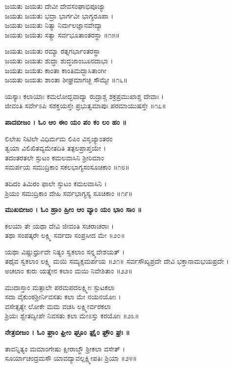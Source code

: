 ಜಯತು ಜಯತು ದೇವೀ ದೇವಸಂಘಾಭಿಪೂಜ್ಯಾ \\ಜಯತು ಜಯತು ಭದ್ರಾ ಭಾರ್ಗವೀ ಭಾಗ್ಯರೂಪಾ ।\\
ಜಯತು ಜಯತು ನಿತ್ಯಾ ನಿರ್ಮಲಜ್ಞಾನವೇದ್ಯಾ \\ಜಯತು ಜಯತು ಸತ್ಯಾ ಸರ್ವಭೂತಾಂತರಸ್ಥಾ ॥೧೫॥

	ಜಯತು ಜಯತು ರಮ್ಯಾ ರತ್ನಗರ್ಭಾಂತರಸ್ಥಾ \\ಜಯತು ಜಯತು ಶುದ್ಧಾ ಶುದ್ಧಜಾಂಬೂನದಾಭಾ ।\\
	ಜಯತು ಜಯತು ಕಾಂತಾ ಕಾಂತಿಮದ್ಭಾಸಿತಾಂಗೀ \\ಜಯತು ಜಯತು ಶಾಂತಾ ಶೀಘ್ರಮಾಗಚ್ಛ ಸೌಮ್ಯೇ ॥೧೬॥

ಯಸ್ಯಾಃ ಕಲಾಯಾಃ ಕಮಲೋದ್ಭವಾದ್ಯಾ ರುದ್ರಾಶ್ಚ ಶಕ್ರಪ್ರಮುಖಾಶ್ಚ ದೇವಾಃ ।\\
ಜೀವಂತಿ ಸರ್ವೇಽಪಿ ಸಶಕ್ತಯಸ್ತೇ ಪ್ರಭುತ್ವಮಾಪುಃ ಪರಮಾಯುಷಸ್ತೇ ॥೧೭॥

{\bfseries ಪಾದಬೀಜಂ । ಓಂ ಆಂ ಈಂ ಯಂ ಪಂ ಕಂ ಲಂ ಹಂ ॥}

ಲಿಲೇಖ ನಿಟಿಲೇ ವಿಧಿರ್ಮಮ ಲಿಪಿಂ ವಿಸೃಜ್ಯಾಂತರಂ\\
ತ್ವಯಾ ವಿಲಿಖಿತವ್ಯಮೇತದಿತಿ ತತ್ಫಲಪ್ರಾಪ್ತಯೇ ।\\
	ತದಂತರತಲೇ ಸ್ಫುಟಂ ಕಮಲವಾಸಿನಿ ಶ್ರೀರಿಮಾಂ\\
	ಸಮರ್ಪಯ ಸಮುದ್ರಿಕಾಂ ಸಕಲಭಾಗ್ಯಸಂಸೂಚಿಕಾಂ ॥೧೮॥

ತದಿದಂ ತಿಮಿರಂ ಫಾಲೇ ಸ್ಫುಟಂ ಕಮಲವಾಸಿನಿ ।\\
ಶ್ರಿಯಂ ಸಮುದ್ರಿಕಾಂ ದೇಹಿ ಸರ್ವಭಾಗ್ಯಸ್ಯ ಸೂಚಿಕಾಂ ॥೧೯॥

{\bfseries ಮುಖಬೀಜಂ । ಓಂ ಹ್ರಾಂ ಹ್ರೀಂ ಆಂ ವ್ಯಾಂ ಯಂ ಭಾಂ ಸಾಂ ॥}

	ಕಲಯಾ ತೇ ಯಥಾ ದೇವಿ ಜೀವಂತಿ ಸಚರಾಚರಾಃ ।\\
	ತಥಾ ಸಂಪತ್ಕರೇ ಲಕ್ಷ್ಮಿ ಸರ್ವದಾ ಸಂಪ್ರಸೀದ ಮೇ ॥೨೦॥

ಯಥಾ ವಿಷ್ಣುರ್ಧ್ರುವೇ ನಿತ್ಯಂ ಸ್ವಕಲಾಂ ಸನ್ನ್ಯವೇಶಯತ್ ।\\
ತಥೈವ ಸ್ವಕಲಾಂ ಲಕ್ಷ್ಮಿ ಮಯಿ ಸಮ್ಯಕ್ಸಮರ್ಪಯ ॥೨೧॥
\newpage
	ಸರ್ವಸೌಖ್ಯಪ್ರದೇ ದೇವಿ ಭಕ್ತಾನಾಮಭಯಪ್ರದೇ ।\\
	ಅಚಲಾಂ ಕುರು ಯತ್ನೇನ ಕಲಾಂ ಮಯಿ ನಿವೇಶಿತಾಂ ॥೨೨॥

ಮುದಾಸ್ತಾಂ ಮತ್ಫಾಲೇ ಪರಮಪದಲಕ್ಷ್ಮೀಃ ಸ್ಫುಟಕಲಾ\\
ಸದಾ ವೈಕುಂಠಶ್ರೀರ್ನಿವಸತು ಕಲಾ ಮೇ ನಯನಯೋಃ ।\\
	ವಸೇತ್ಸತ್ಯೇ ಲೋಕೇ ಮಮ ವಚಸಿ ಲಕ್ಷ್ಮೀರ್ವರಕಲಾ\\
	ಶ್ರಿಯಃ ಶ್ವೇತದ್ವೀಪೇ ನಿವಸತು ಕಲಾ ಮೇಽಸ್ತು ಕರಯೋಃ ॥೨೩॥

{\bfseries ನೇತ್ರಬೀಜಂ । ಓಂ ಘ್ರಾಂ ಘ್ರೀಂ ಘ್ರೂಂ ಘ್ರೈಂ ಘ್ರೌಂ ಘ್ರಃ ॥}

ತಾವನ್ನಿತ್ಯಂ ಮಮಾಂಗೇಷು ಕ್ಷೀರಾಬ್ಧೌ ಶ್ರೀಕಲಾ ವಸೇತ್ ।\\
ಸೂರ್ಯಾಚಂದ್ರಮಸೌ ಯಾವದ್ಯಾವಲ್ಲಕ್ಷ್ಮೀಪತಿಃ ಶ್ರಿಯಾ ॥೨೪॥

